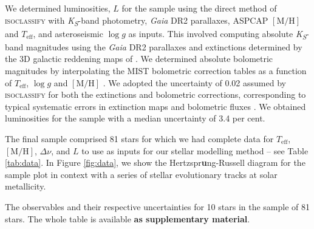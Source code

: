 \documentclass[fleqn,usenatbib]{mnras}
\newcommand{\dnu}{\ensuremath{\Delta\nu}}
\newcommand{\metallicity}{\ensuremath{[\mathrm{M}/\mathrm{H}]}}
\newcommand{\teff}{\ensuremath{T_\mathrm{eff}}}
\begin{document}
We determined luminosities, $L$ for the sample using the direct method of \textsc{isoclassify} \citep{Huber.Zinn.ea2017, Berger.Huber.ea2020} with \emph{K\textsubscript{S}}-band photometry, \emph{Gaia} DR2 parallaxes, ASPCAP $\metallicity$ and $\teff$, and asteroseismic $\log g$ as inputs. This involved computing absolute \emph{K\textsubscript{S}}-band magnitudes using the \emph{Gaia} DR2 parallaxes and extinctions determined by the 3D galactic reddening maps of \citet{Green.Schlafly.ea2018}. We determined absolute bolometric magnitudes by interpolating the MIST bolometric correction tables as a function of $\teff$, $\log g$ and $\metallicity$ \citep{Dotter2016, Choi.Dotter.ea2016}. We adopted the uncertainty of \SI{0.02}{\magnitude} assumed by \textsc{isoclassify} for both the extinctions and bolometric corrections, corresponding to typical systematic errors in extinction maps and bolometric fluxes \citep[e.g.][]{Zinn.Pinsonneault.ea2019a,Tayar.Claytor.ea2020}. We obtained luminosities for the sample with a median uncertainty of 3.4 per cent.

The final sample comprised 81 stars for which we had complete data for $\teff$, $\metallicity$, $\dnu$, and $L$ to use as inputs for our stellar modelling method -- see Table \ref{tab:data}. In Figure \ref{fig:data}, we show the Hertzspr\textbf{\color{red}u}ng-Russell diagram for the sample plot in context with a series of stellar evolutionary tracks at solar metallicity.

\begin{table}
	\centering
	\caption{The observables and their respective uncertainties for 10 stars in the sample of 81 stars. The whole table is available \textbf{\color{red} as supplementary material}.}
	\label{tab:data}
	
\end{table}
\end{document}
